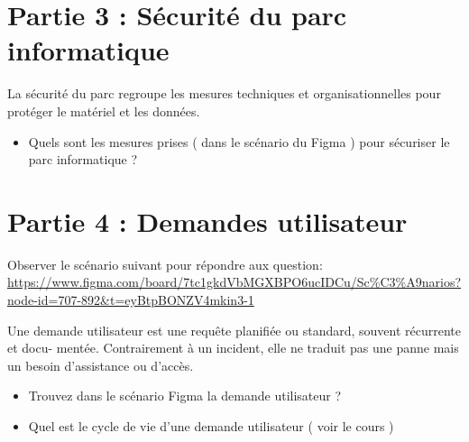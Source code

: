 \documentclass[12pt, letterpaper]{article}
\begin{document}
\section*{Partie 3 : Sécurité du parc informatique}


\begin{tcolorbox}[colback=brown!5,colframe=brown!60!black,title=Définition]
La sécurité du parc regroupe les mesures techniques et organisationnelles pour protéger le
matériel et les données.
\end{tcolorbox}

\begin{itemize}
    \item Quels sont les mesures prises ( dans le scénario du Figma ) pour sécuriser le parc informatique ?
\end{itemize}


\section*{Partie 4 : Demandes utilisateur}

\begin{tcolorbox}[colback=green!5,colframe=green!60!black,title=Figme d'étude (difficile)]
Observer le scénario suivant pour répondre aux question: 
\url{https://www.figma.com/board/7tc1gkdVbMGXBPO6ucIDCu/Sc%C3%A9narios?node-id=707-892&t=eyBtpBONZV4mkin3-1}
\end{tcolorbox}


\begin{tcolorbox}[colback=brown!5,colframe=brown!60!black,title=Définition]
Une demande utilisateur est une requête planifiée ou standard, souvent récurrente et docu-
mentée. Contrairement à un incident, elle ne traduit pas une panne mais un besoin d’assistance
ou d’accès.
\end{tcolorbox}

\begin{itemize}
    \item Trouvez dans le scénario Figma la demande utilisateur ?  
    \item Quel est le cycle de vie d’une demande utilisateur ( voir le cours )
\end{itemize}
\end{document}
